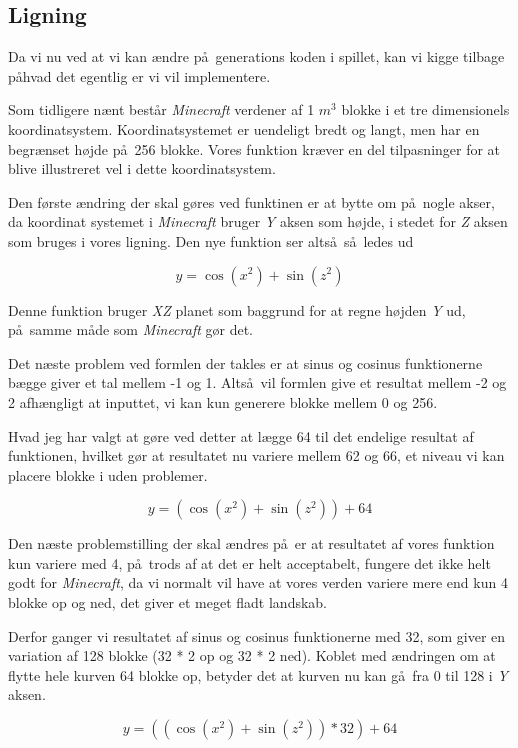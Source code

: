 \documentclass[a4paper,12pt]{report}
\begin{document}
		\subsection{Ligning}
		Da vi nu ved at vi kan \ae ndre p\aa \ generations koden i spillet, kan vi kigge tilbage p\aa hvad det egentlig er vi vil implementere.

		Som tidligere n\ae nt best\aa r \emph{Minecraft} verdener af 1 \(m^3\) blokke i et tre dimensionels koordinatsystem. Koordinatsystemet
		er uendeligt bredt og langt, men har en begr\ae nset h\o jde p\aa \ 256 blokke.
		Vores funktion kr\ae ver en del tilpasninger for at blive illustreret vel i dette koordinatsystem.

		Den f\o rste \ae ndring der skal g\o res ved funktinen er at bytte om p\aa \ nogle akser,
		da koordinat systemet i \emph{Minecraft} bruger \emph{Y} aksen som h\o jde, i stedet for \emph{Z} aksen som bruges
		i vores ligning. Den nye funktion ser alts\aa \ s\aa \ ledes ud

		\[y = \cos (x^2) + \sin (z^2)\]

		Denne funktion bruger \emph{XZ} planet som baggrund for at regne højden \emph{Y} ud,
		p\aa \ samme m\aa de som \emph{Minecraft} g\o r det.

		Det n\ae ste problem ved formlen der takles er at sinus og cosinus funktionerne b\ae gge giver et tal mellem -1 og 1.
		Alts\aa \ vil formlen give et resultat mellem -2 og 2 afh\ae ngligt at inputtet, vi kan kun generere blokke mellem
		0 og 256.

		Hvad jeg har valgt at g\o re ved detter at l\ae gge 64 til det endelige resultat af funktionen, hvilket g\o r at resultatet
		nu variere mellem 62 og 66, et niveau vi kan placere blokke i uden problemer.

		\[y = (\cos (x^2) + \sin (z^2)) + 64\]

		Den n\ae ste problemstilling der skal \ae ndres p\aa \ er at resultatet af vores funktion kun variere med 4, p\aa \
		trods af at det er helt acceptabelt, fungere det ikke helt godt for \emph{Minecraft}, da vi normalt vil have at vores verden
		variere mere end kun 4 blokke op og ned, det giver et meget fladt landskab.

		Derfor ganger vi resultatet af sinus og cosinus funktionerne med 32, som giver en variation af 128 blokke (32 * 2 op og 32 * 2 ned).
		Koblet med \ae ndringen om at flytte hele kurven 64 blokke op, betyder det at kurven nu kan g\aa \ fra 0 til 128 i \emph{Y} aksen.

		\[y = ((\cos (x^2) + \sin (z^2)) * 32) + 64\]
\end{document}
